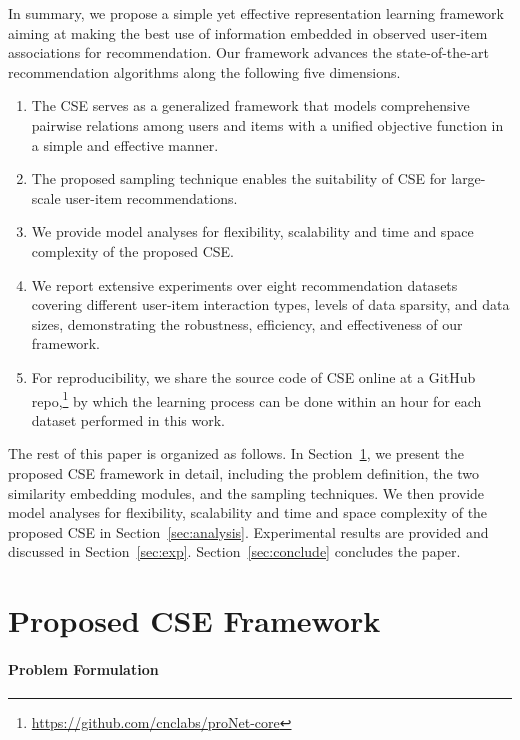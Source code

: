 \documentclass[sigconf,anonymous=false]{acmart}
\begin{document}
In summary, we propose a simple yet effective representation learning framework
aiming at making the best use of information embedded in observed user-item
associations for recommendation.
Our framework advances the state-of-the-art recommendation algorithms along the
following five dimensions.
\begin{enumerate}
    \item
      The CSE serves as a generalized framework that models comprehensive
      pairwise relations among users and items with a unified objective
      function in a simple and effective manner.
    \item 
      The proposed sampling technique enables the suitability of CSE for
      large-scale user-item recommendations.
      \item
        We provide model analyses for flexibility, scalability and time
        and space complexity of the proposed CSE.
    \item
      We report extensive experiments over eight recommendation datasets
      covering different user-item interaction types, levels of data sparsity,
      and data sizes, demonstrating the robustness, efficiency, and
      effectiveness of our framework.
    \item
      For reproducibility, we share the source code of CSE online at a GitHub
        repo,\footnote{ \url{https://github.com/cnclabs/proNet-core}
      } by which the learning process can be done within an hour for
  each dataset performed in this work.
\end{enumerate}

The rest of this paper is organized as follows.
In Section~\ref{sec:CSE}, we present the proposed CSE framework in detail,
including the problem definition, the two similarity embedding modules, and the
sampling techniques.
We then provide model analyses for flexibility, scalability and time and space
complexity of the proposed CSE in Section~\ref{sec:analysis}.
Experimental results are provided and discussed in Section~\ref{sec:exp}.
Section~\ref{sec:conclude} concludes the paper.

\section{Proposed CSE Framework}\label{sec:CSE}

\paragraph{Problem Formulation}
\end{document}
